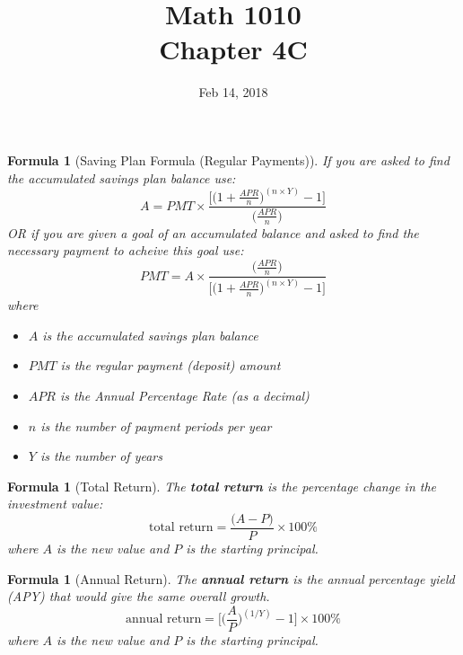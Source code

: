 \documentclass[12pt]{article}
\newtheorem{formula}[theorem]{Formula}
\begin{document}
\title{\bf Math 1010 \\ Chapter 4C\iftoggle{sol}{ Key}{} }
\date{Feb 14, 2018}
\maketitle


\renewcommand{\theenumi}{\alph{enumi}}
\renewcommand{\labelenumi}{(\theenumi)}

\begin{formula}[Saving Plan Formula (Regular Payments)]
If you are asked to find the accumulated savings plan balance use:
	\begin{equation}\label{eq:savings_plan_regular}
		A = PMT \times \frac{\Big[\Big(1 + \frac{APR}{n}\Big)^{(n\times Y)} - 1\Big]}{\Big(\frac{APR}{n}\Big)}
	\end{equation}
	OR if you are given a goal of an accumulated balance and asked to find the necessary payment to acheive this goal use:
	\begin{equation}\label{eq:savings_plan_regular_pmt}
		PMT = A \times \frac{\Big(\frac{APR}{n}\Big)}{\Big[\Big(1 + \frac{APR}{n}\Big)^{(n\times Y)} - 1\Big]}
	\end{equation}
	where
	\begin{itemize}
		\item $A$ is the accumulated savings plan balance
		\item $PMT$ is the regular payment (deposit) amount
		\item $APR$ is the Annual Percentage Rate  (as a decimal)
		\item $n$ is the number of payment periods per year
		\item $Y$ is the number of years
	\end{itemize}
\end{formula}

\begin{formula}[Total Return]
	The {\bf total return} is the percentage change in the investment value:
	\begin{equation}\label{eq:total}
		\text{total return} = \frac{\Big(A-P\Big)}{P}\times 100\%
	\end{equation}
	where $A$ is the new value and $P$ is the starting principal.
\end{formula}

\begin{formula}[Annual Return]
	The {\bf annual return} is the annual percentage yield (APY) that would give the same overall growth.
	\begin{equation}\label{eq:annual}
		\text{annual return} = \Big[\Big(\frac{A}{P}\Big)^{(1 / Y)} - 1\Big] \times 100\%
	\end{equation}
	where $A$ is the new value and $P$ is the starting principal.
\end{formula}
\end{document}
